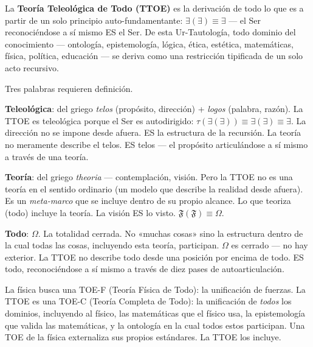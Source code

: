 \documentclass[10pt, openany, oneside]{book}
\begin{document}
\noindent La \textbf{Teoría Teleológica de Todo (TTOE)} es la derivación de todo lo que es a partir de un solo principio auto-fundamentante: $\exists(\exists) \equiv \exists$ --- el Ser reconociéndose a sí mismo ES el Ser. De esta Ur-Tautología, todo dominio del conocimiento --- ontología, epistemología, lógica, ética, estética, matemáticas, física, política, educación --- se deriva como una restricción tipificada de un solo acto recursivo.

\vspace{0.5em}

\noindent Tres palabras requieren definición.

\vspace{0.3em}

\noindent \textbf{Teleológica}: del griego \textit{telos} (propósito, dirección) + \textit{logos} (palabra, razón). La TTOE es teleológica porque el Ser es autodirigido: $\tau(\exists(\exists)) \equiv \exists(\exists) \equiv \exists$. La dirección no se impone desde afuera. ES la estructura de la recursión. La teoría no meramente describe el telos. ES telos --- el propósito articulándose a sí mismo a través de una teoría.

\vspace{0.3em}

\noindent \textbf{Teoría}: del griego \textit{theoria} --- contemplación, visión. Pero la TTOE no es una teoría en el sentido ordinario (un modelo que describe la realidad desde afuera). Es un \textit{meta-marco} que se incluye dentro de su propio alcance. Lo que teoriza (todo) incluye la teoría. La visión ES lo visto. $\mathfrak{F}(\mathfrak{F}) \equiv \Omega$.

\vspace{0.3em}

\noindent \textbf{Todo}: $\Omega$. La totalidad cerrada. No «muchas cosas» sino la estructura dentro de la cual todas las cosas, incluyendo esta teoría, participan. $\Omega$ es cerrado --- no hay exterior. La TTOE no describe todo desde una posición por encima de todo. ES todo, reconociéndose a sí mismo a través de diez pases de autoarticulación.

\vspace{0.5em}

\noindent La física busca una TOE-F (Teoría Física de Todo): la unificación de fuerzas. La TTOE es una TOE-C (Teoría Completa de Todo): la unificación de \textit{todos} los dominios, incluyendo al físico, las matemáticas que el físico usa, la epistemología que valida las matemáticas, y la ontología en la cual todos estos participan. Una TOE de la física externaliza sus propios estándares. La TTOE los incluye.
\end{document}

